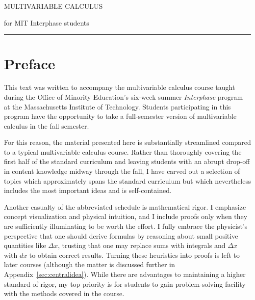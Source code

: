 \documentclass[svgnames]{watsonbook}
\begin{document}
 

\begin{titlepage} 
  \pagecolor{softblue}
  {\titlefont \color{MidnightBlue} MULTIVARIABLE CALCULUS} 
  
  \vspace*{5mm} 
  { \hspace*{9cm} \subtitlefont for MIT Interphase students} \par
  \null\vfill
  \vspace*{1cm}
  \noindent
  \hfill
  \begin{minipage}{0.35\linewidth}
    \begin{flushright}
      \printauthor
    \end{flushright}
  \end{minipage}
  \begin{minipage}{0.02\linewidth}
    \rule{1pt}{125pt}
  \end{minipage}
  \titlepagedecoration
\end{titlepage}


\chapter*{Preface} 

\pagecolor{white} 

This text was written to accompany the multivariable calculus course
taught during the Office of Minority Education's six-week summer
\textit{Interphase} program at the Massachusetts Institute of
Technology. Students participating in this program have the
opportunity to take a full-semester version of multivariable calculus
in the fall semester. 

For this reason, the material presented here is substantially
streamlined compared to a typical multivariable calculus
course. Rather than thoroughly covering the first half of the standard
curriculum and leaving students with an abrupt drop-off in content
knowledge midway through the fall, I have carved out a selection of
topics which approximately spans the standard curriculum but which 
nevertheless includes the most important ideas and is self-contained.

Another casualty of the abbreviated schedule is mathematical rigor. I
emphasize concept visualization and physical intuition, and I include
proofs only when they are sufficiently illuminating to be worth the
effort. I fully embrace the physicist's perspective that one should
derive formulas by reasoning about small positive quantities like
$\Delta x$, trusting that one may replace sums with integrals and
$\Delta x$ with $dx$ to obtain correct results. Turning these
heuristics into proofs is left to later courses (although the matter
is discussed further in Appendix~\ref{sec:centralidea}). While there
are advantages to maintaining a higher standard of rigor, my top
priority is for students to gain problem-solving facility with the
methods covered in the course.
\end{document}
